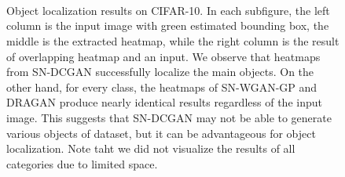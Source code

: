 \documentclass[runningheads]{llncs}
\begin{document}
\begin{figure}[t!]
    \noindent
    \begin{center}
        \\
        \\
        \\
    \end{center}
    \vspace*{-5mm}
    \caption{Object localization results on CIFAR-10. In each subfigure, the left column is the input image with green estimated bounding box, the middle is the extracted heatmap, while the right column is the result of overlapping heatmap and an input. We observe that heatmaps from SN-DCGAN successfully localize the main objects. On the other hand, for every class, the heatmaps of SN-WGAN-GP and DRAGAN produce nearly identical results regardless of the input image. This suggests that SN-DCGAN may not be able to generate various objects of dataset, but it can be advantageous for object localization. Note taht we did not visualize the results of all categories due to limited space.}
\label{fig:cifar10}
\vspace*{-5mm}
\end{figure}
\end{document}
